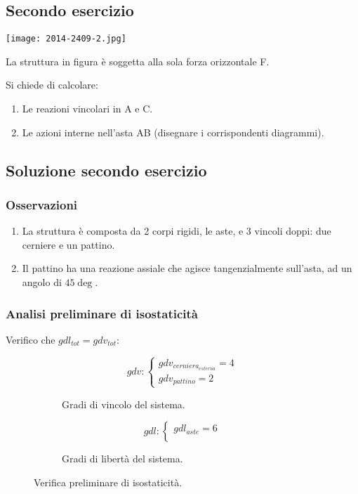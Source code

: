 \documentclass[main.tex]{subfiles}
\begin{document}
\subsection{Secondo esercizio}

\texttt{[image: 2014-2409-2.jpg]}

La struttura in figura è soggetta alla sola forza orizzontale F.

Si chiede di calcolare:

\begin{enumerate}
\item Le reazioni vincolari in A e C.
\item Le azioni interne nell’asta AB (disegnare i corrispondenti diagrammi).
\end{enumerate}

\clearpage

\subsection{Soluzione secondo esercizio}

\subsubsection{Osservazioni}

\begin{enumerate}
\item La struttura è composta da 2 corpi rigidi, le aste, e 3 vincoli doppi: due cerniere e un pattino.
\item Il pattino ha una reazione assiale che agisce tangenzialmente sull'asta, ad un angolo di $45\deg$.
\end{enumerate}

\subsubsection{Analisi preliminare di isostaticità}
Verifico che $gdl_{tot} = gdv_{tot}$:
\begin{figure}[H]
  \begin{subfigure}[b]{.5\textwidth}
  \centering
  \[
  	gdv: \begin{cases}
		gdv_{cerniera_{esterna}} = 4\\
		gdv_{pattino} = 2
  	\end{cases}
  \]
  \caption{Gradi di vincolo del sistema.}
  \end{subfigure}
  \hfill
  \begin{subfigure}[b]{.5\textwidth}
  \centering
  \[
  	gdl: \begin{cases}
  		gdl_{aste} = 6\\
  	\end{cases}
  \]
  \caption{Gradi di libertà del sistema.}
  \end{subfigure}
  \caption{Verifica preliminare di isostaticità.}
\end{figure}
\end{document}

